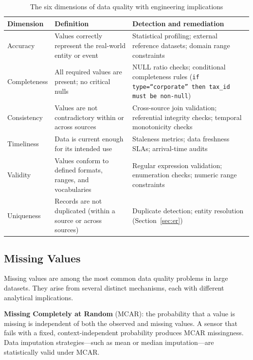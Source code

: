 \begin{table}[h!t]
\centering
\caption{The six dimensions of data quality with engineering implications}
\label{tab:dq-dimensions}
\renewcommand{\arraystretch}{1.45}
\begin{tabular}{L{2.2cm} L{3.6cm} L{4.6cm}}
\toprule
\textbf{Dimension} & \textbf{Definition} & \textbf{Detection and remediation} \\
\midrule
Accuracy      & Values correctly represent the real-world entity or event &
                Statistical profiling; external reference datasets; domain
                range constraints \\
Completeness  & All required values are present; no critical nulls &
                NULL ratio checks; conditional completeness rules
                (\texttt{if type=``corporate'' then tax\_id must be non-null}) \\
Consistency   & Values are not contradictory within or across sources &
                Cross-source join validation; referential integrity checks;
                temporal monotonicity checks \\
Timeliness    & Data is current enough for its intended use &
                Staleness metrics; data freshness SLAs; arrival-time audits \\
Validity      & Values conform to defined formats, ranges, and vocabularies &
                Regular expression validation; enumeration checks;
                numeric range constraints \\
Uniqueness    & Records are not duplicated (within a source or across sources) &
                Duplicate detection; entity resolution (Section~\ref{sec:er}) \\
\bottomrule
\end{tabular}
\end{table}

\subsection{Missing Values}
\label{subsec:missing-values}

Missing values are among the most common data quality problems in large
datasets. They arise from several distinct mechanisms, each with
different analytical implications.

\textbf{Missing Completely at Random} (MCAR): the probability that a
value is missing is independent of both the observed and missing values.
A sensor that fails with a fixed, context-independent probability
produces MCAR missingness. Data imputation strategies---such as mean or
median imputation---are statistically valid under MCAR.

